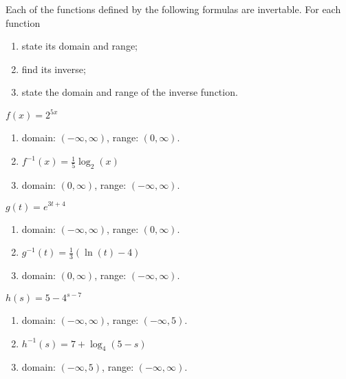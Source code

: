 \begin{exercises}
\begin{problem}
Each of the functions defined by the following formulas are invertable. For each function
\begin{enumerate}
	\item state its domain and range;
	\item find its inverse;
	\item state the domain and range of the inverse function.
\end{enumerate}
\begin{multicols}{4}
	\begin{subproblem}
		$f(x)=2^{5x}$ 
		\begin{shortsolution}
			\begin{enumerate}
				\item domain: $(-\infty,\infty)$, range: $(0,\infty)$.
				\item $f^{-1}(x)=\frac{1}{5}\log_2(x)$ 
				\item domain: $(0,\infty)$, range: $(-\infty,\infty)$.
			\end{enumerate}
		\end{shortsolution}
	\end{subproblem}
	\begin{subproblem}
		$g(t)=e^{3t+4}$ 
		\begin{shortsolution}
			\begin{enumerate}
				\item domain: $(-\infty,\infty)$, range: $(0,\infty)$.
				\item $g^{-1}(t)=\frac{1}{3}(\ln(t)-4)$ 
				\item domain: $(0,\infty)$, range: $(-\infty,\infty)$.
			\end{enumerate}
		\end{shortsolution}
	\end{subproblem}
	\begin{subproblem}
		$h(s)=5-4^{s-7}$ 
		\begin{shortsolution}
			\begin{enumerate}
				\item domain: $(-\infty,\infty)$, range: $(-\infty,5)$.
				\item $h^{-1}(s)=7+\log_4(5-s)$ 
				\item domain: $(-\infty,5)$, range: $(-\infty,\infty)$.
			\end{enumerate}
		\end{shortsolution}

\end{subproblem}
\end{multicols}
\end{problem}
\end{exercises}
